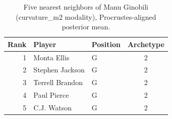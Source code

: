 \begin{table}[htbp]
  \centering\small
  \begin{tabular}{rllc}
    \toprule
    Rank & Player & Position & Archetype \\
    \midrule
    1 & Monta Ellis & G & 2 \\
    2 & Stephen Jackson & G & 2 \\
    3 & Terrell Brandon & G & 2 \\
    4 & Paul Pierce & G & 2 \\
    5 & C.J. Watson & G & 2 \\
    \bottomrule
  \end{tabular}
  \caption{Five nearest neighbors of Manu Ginobili (curvature_m2 modality), Procrustes-aligned posterior mean.}
  \label{tab:Manu_Ginobili_neighbors_curvature_m2}
\end{table}

